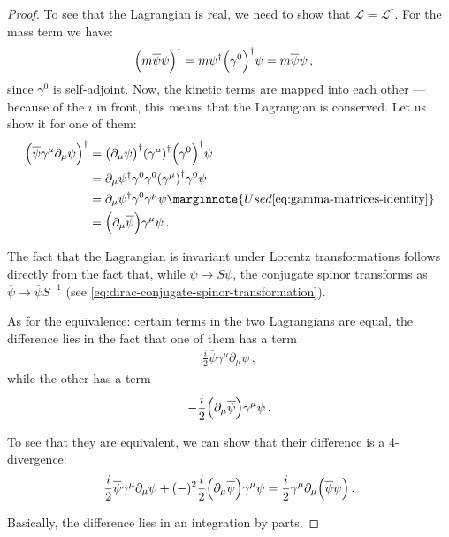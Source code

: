 \documentclass[main.tex]{subfiles}
\begin{document}
\begin{proof}
To see that the Lagrangian is real, we need to show that \(\mathscr{L} = \mathscr{L} ^\dag\). For the mass term we have: 
%
\begin{align}
\qty(m \overline{\psi} \psi ) ^\dag &= m \psi ^\dag \qty(\gamma^{0} )^\dag \psi = m \overline{\psi} \psi 
\,,
\end{align}
%
since \(\gamma^{0}\) is self-adjoint. Now, the kinetic terms are mapped into each other --- because of the \(i\) in front, this means that the Lagrangian is conserved. Let us show it for one of them: 
%
\begin{subequations}
\begin{align}
\qty(\overline{\psi} \gamma^{\mu } \partial_{\mu } \psi )^\dag &=
\qty(\partial_{\mu } \psi ) ^\dag \qty(\gamma^{\mu })^\dag \qty(\gamma^{0})^\dag \psi  \\
&= \partial_{\mu } \psi ^\dag \gamma^{0} \gamma^{0} \qty(\gamma^{\mu }) ^\dag \gamma^{0} \psi  \\
&= \partial_{\mu } \psi ^\dag \gamma^{0} \gamma^{\mu } \psi  \marginnote{Used \eqref{eq:gamma-matrices-identity}}\\
&= \qty(\partial_{\mu } \overline{\psi}) \gamma^{\mu } \psi 
\,.
\end{align}
\end{subequations}

The fact that the Lagrangian is invariant under Lorentz transformations follows directly from the fact that, while \(\psi \to S \psi \), the conjugate spinor transforms as \(\overline{\psi} \to \overline{\psi} S^{-1}\) (see \eqref{eq:dirac-conjugate-spinor-transformation}). 

As for the equivalence: certain terms in the two Lagrangians are equal, the difference lies in the fact that one of them has a term 
%
\begin{align}
\frac{i}{2} \overline{\psi} \gamma^{\mu } \partial_{\mu } \psi 
\,,
\end{align}
%
while the other has a term 
%
\begin{align}
- \frac{i}{2} \qty(\partial_{\mu } \overline{\psi}) \gamma^{\mu } \psi  
\,.
\end{align}

To see that they are equivalent, we can show that their difference is a 4-divergence: 
%
\begin{align}
\frac{i}{2} \overline{\psi} \gamma^{\mu } \partial_{\mu } \psi + (-)^2 \frac{i}{2} \qty(\partial_{\mu } \overline{\psi} )\gamma^{\mu } \psi 
= \frac{i}{2} \gamma^{\mu } \partial_{\mu } \qty(\overline{\psi} \psi )
\,.
\end{align}

Basically, the difference lies in an integration by parts. 
\end{proof}
\end{document}
